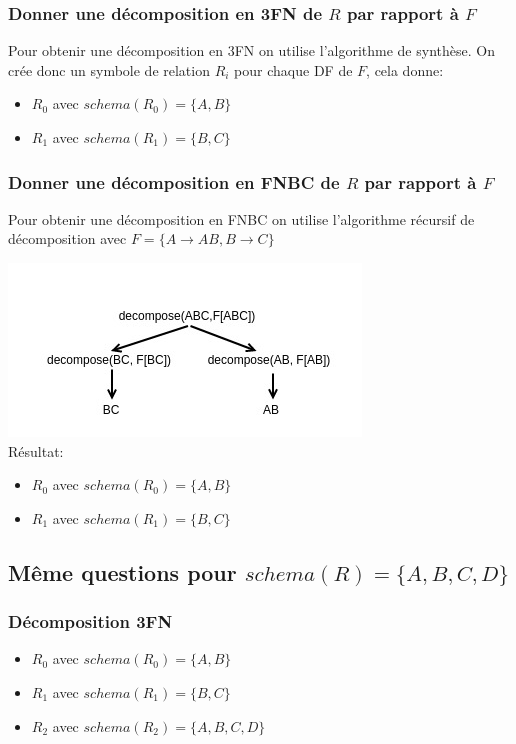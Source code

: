 \documentclass[10pt,a4paper,twoside]{article}
\begin{document}
\subsubsection{Donner une décomposition en 3FN de $R$ par rapport à $F$}
Pour obtenir une décomposition en 3FN on utilise l'algorithme de synthèse. On crée donc un symbole de relation $R_{i}$ pour chaque DF de $F$, cela donne:
\begin{itemize}
\item $R_{0}$ avec $schema(R_{0})=\{A,B\}$
\item $R_{1}$ avec $schema(R_{1})=\{B,C\}$
\end{itemize}

\subsubsection{Donner une décomposition en FNBC de $R$ par rapport à $F$}
Pour obtenir une décomposition en FNBC on utilise l'algorithme récursif de décomposition avec $F=\{A \rightarrow AB, B \rightarrow C\}$

\includegraphics[scale=0.75]{decompose1.jpg}\\
 
Résultat:
\begin{itemize}
\item $R_{0}$ avec $schema(R_{0})=\{A,B\}$
\item $R_{1}$ avec $schema(R_{1})=\{B,C\}$
\end{itemize}


\subsection{Même questions pour $schema(R)=\{A,B,C,D\}$}
\subsubsection{Décomposition 3FN}
\begin{itemize}
\item $R_{0}$ avec $schema(R_{0})=\{A,B\}$
\item $R_{1}$ avec $schema(R_{1})=\{B,C\}$
\item $R_{2}$ avec $schema(R_{2})=\{A,B,C,D\}$
\end{itemize}
\end{document}
